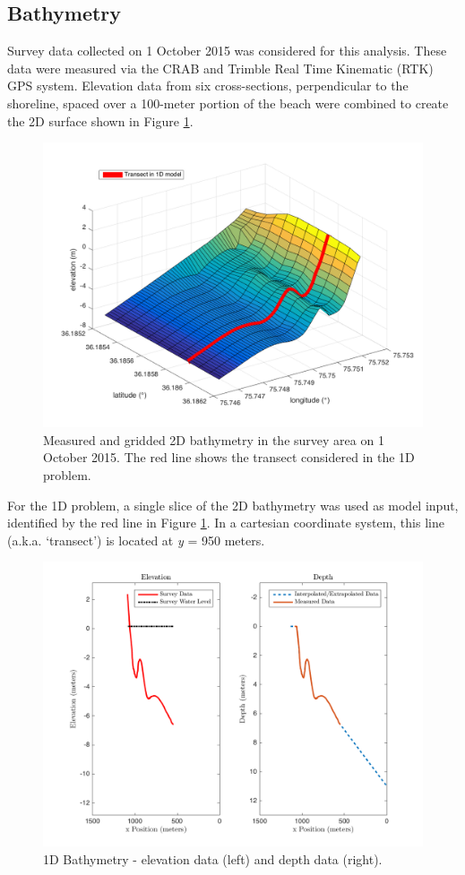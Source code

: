 \subsection{Bathymetry}
\label{sec: bathy}

	Survey data collected on 1 October 2015 was considered for this analysis. These data were measured via the CRAB and Trimble Real Time Kinematic (RTK) GPS system. Elevation data from six cross-sections, perpendicular to the shoreline, spaced over a 100-meter portion of the beach were combined to create the 2D surface shown in Figure \ref{2D Bath}. 
	
	 	\begin{figure}[H]
	 	\centering
	 	\includegraphics[width=0.5\linewidth]{img/trueBath2D.png}
	 	\caption{Measured and gridded 2D bathymetry in the survey area on 1 October 2015. The red line shows the transect considered in the 1D problem.}
	 	\label{2D Bath}
	 	\end{figure}
	
	For the 1D problem, a single slice of the 2D bathymetry was used as model input, identified by the red line in Figure \ref{2D Bath}. In a cartesian coordinate system, this line (a.k.a. `transect') is located at \textit{y} = 950 meters. 
		
		\begin{figure}[H]
		\centering
		\includegraphics[width = 0.65\linewidth]{img/trueBath1D.png}
		\caption{1D Bathymetry - elevation data (left) and depth data (right).}
		\label{1D Bath}
		\end{figure}
		
